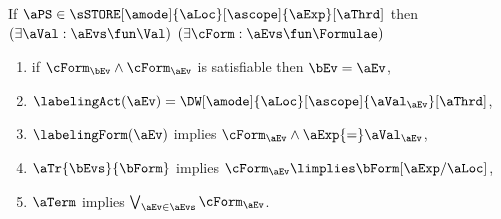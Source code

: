 \medskip
  If $\aPS \in \sSTORE[\amode]{\aLoc}[\ascope]{\aExp}[\aThrd]$ then
  $(\exists\aVal:\aEvs\fun\Val)$
  $(\exists\cForm:\aEvs\fun\Formulae)$
  \begin{enumerate}[topsep=0pt]
  \item
    if $\cForm_\bEv\land\cForm_\aEv$ is satisfiable then $\bEv=\aEv$,
  \item
    $\labelingAct(\aEv) = \DW[\amode]{\aLoc}[\ascope]{\aVal_\aEv}[\aThrd]$,
  \item
    $\labelingForm(\aEv)$ implies
    \begin{math}
      \cForm_\aEv
      \land \aExp{=}\aVal_\aEv
    \end{math},
    
    
  \item
    $\aTr{\bEvs}{\bForm}$ implies 
    \begin{math}
      \cForm_\aEv
      \limplies 
      \bForm[\aExp/\aLoc]
    \end{math},
  \item
    $\aTerm$ implies $\bigvee_{\aEv\in\aEvs}\cForm_\aEv$.
  \end{enumerate}


